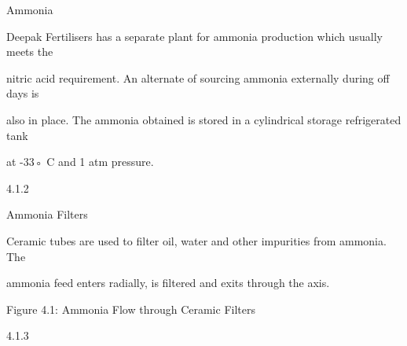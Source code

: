 \documentclass[a4paper,portrait,12pt]{article}
\begin{document}
\begin{flushleft}
Ammonia
\end{flushleft}





\begin{flushleft}
Deepak Fertilisers has a separate plant for ammonia production which usually meets the
\end{flushleft}


\begin{flushleft}
nitric acid requirement. An alternate of sourcing ammonia externally during off days is
\end{flushleft}


\begin{flushleft}
also in place. The ammonia obtained is stored in a cylindrical storage refrigerated tank
\end{flushleft}


\begin{flushleft}
at -33◦ C and 1 atm pressure.
\end{flushleft}





4.1.2





\begin{flushleft}
Ammonia Filters
\end{flushleft}





\begin{flushleft}
Ceramic tubes are used to filter oil, water and other impurities from ammonia. The
\end{flushleft}


\begin{flushleft}
ammonia feed enters radially, is filtered and exits through the axis.
\end{flushleft}





\begin{flushleft}
Figure 4.1: Ammonia Flow through Ceramic Filters
\end{flushleft}





4.1.3
\end{document}

